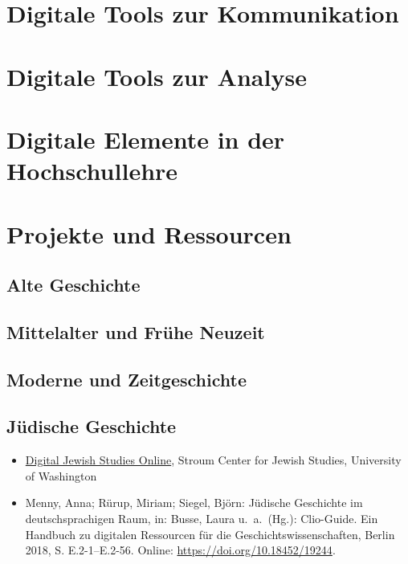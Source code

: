 \documentclass[
  letterpaper,
]{book}
\begin{document}
\hypertarget{digitale-tools-zur-kommunikation}{%
\section{Digitale Tools zur
Kommunikation}\label{digitale-tools-zur-kommunikation}}

\hypertarget{digitale-tools-zur-analyse}{%
\section{Digitale Tools zur Analyse}\label{digitale-tools-zur-analyse}}

\hypertarget{digitale-elemente-in-der-hochschullehre}{%
\section{Digitale Elemente in der
Hochschullehre}\label{digitale-elemente-in-der-hochschullehre}}

\hypertarget{sec-projects}{%
\section{Projekte und Ressourcen}\label{sec-projects}}

\hypertarget{alte-geschichte}{%
\subsection{Alte Geschichte}\label{alte-geschichte}}

\hypertarget{mittelalter-und-fruxfche-neuzeit}{%
\subsection{Mittelalter und Frühe
Neuzeit}\label{mittelalter-und-fruxfche-neuzeit}}

\hypertarget{moderne-und-zeitgeschichte}{%
\subsection{Moderne und
Zeitgeschichte}\label{moderne-und-zeitgeschichte}}

\hypertarget{juxfcdische-geschichte}{%
\subsection{Jüdische Geschichte}\label{juxfcdische-geschichte}}

\begin{itemize}
\item
  \href{https://jewishstudies.washington.edu/digital-jewish-studies/}{Digital
  Jewish Studies Online}, Stroum Center for Jewish Studies, University
  of Washington
\item
  Menny, Anna; Rürup, Miriam; Siegel, Björn: Jüdische Geschichte im
  deutschsprachigen Raum, in: Busse, Laura u.~a.~(Hg.): Clio-Guide. Ein
  Handbuch zu digitalen Ressourcen für die Geschichtswissenschaften,
  Berlin 2018, S. E.2-1--E.2-56. Online:
  \url{https://doi.org/10.18452/19244}.
\end{itemize}
\end{document}
